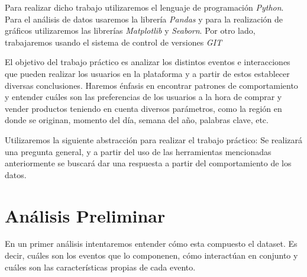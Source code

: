 \documentclass[titlepage,a4paper]{article}
\begin{document}
	Para realizar dicho trabajo utilizaremos el lenguaje de programación \textit{Python}. Para el análisis de datos usaremos la librería \textit{Pandas} y para la realización de gráficos utilizaremos las librerías \textit{Matplotlib }y \textit{Seaborn}. Por otro lado, trabajaremos usando el sistema de control de versiones \textit{GIT}	
	
	El objetivo del trabajo práctico es analizar los distintos eventos e interacciones que pueden realizar los usuarios en la plataforma y a partir de estos establecer diversas conclusiones. Haremos énfasis en encontrar patrones de comportamiento y entender cuáles son las preferencias de los usuarios a la hora de comprar y vender productos teniendo en cuenta diversos parámetros, como la región en donde se originan, momento del día, semana del año, palabras clave, etc.
	
	Utilizaremos la siguiente abstracción para realizar el trabajo práctico: Se realizará una pregunta general, y a partir del uso de las herramientas mencionadas anteriormente se buscará dar una respuesta a partir del comportamiento de los datos.
	
	\section{Análisis Preliminar}
	En un primer análisis intentaremos entender cómo esta compuesto el dataset. Es decir, cuáles son los eventos que lo componenen, cómo interactúan en conjunto y cuáles son las características propias de cada evento. 
\end{document}
